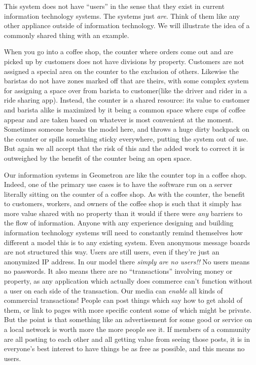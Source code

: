 This system does not have ``users'' in the sense that they exist in current information technology systems.  The systems just \emph{are}.  Think of them like any other appliance outside of information technology.  We will illustrate the idea of a commonly shared thing with an example.

When you go into a coffee shop, the counter where orders come out and are picked up by customers does not have divisions by property.  Customers are not assigned a special area on the counter to the exclusion of others.  Likewise the baristas do not have zones marked off that are theirs, with some complex system for assigning a space over from barista to customer(like the driver and rider in a ride sharing app).  Instead, the counter is a shared resource: its value to customer and barista alike is maximized by it being a common space where cups of coffee appear and are taken based on whatever is most convenient at the moment.  Sometimes someone breaks the model here, and throws a huge dirty backpack on the counter or spills something sticky everywhere, putting the system out of use.  But again we all accept that the risk of this and the added work to correct it is outweighed by the benefit of the counter being an open space.  

Our information systems in Geometron are like the counter top in a coffee shop.  Indeed, one of the primary use cases is to have the software run on a server literally sitting on the counter of a coffee shop.  As with the counter, the benefit to customers, workers, and owners of the coffee shop is such that it simply has more value shared with no property than it would if there were \emph{any} barriers to the flow of information.  Anyone with any experience designing and building information technology systems will need to constantly remind themselves how different a model this is to any existing system.  Even anonymous message boards are not structured this way.  Users are still users, even if they're just an anonymized IP address.  In our model there \emph{simply are no users!!}  No users means no passwords. It also means there are no ``transactions'' involving money or property, as any application which actually does commerce can't function without a user on each side of the transaction.  Our media can \emph{enable} all kinds of commercial transactions! People can post things which say how to get ahold of them, or link to pages with more specific content some of which might be private.  But the point is that something like an advertisement for some good or service on a local network is worth more the more people see it.  If members of a community are all posting to each other and all getting value from seeing those posts, it is in everyone's best interest to have things be as free as possible, and this means no users.

